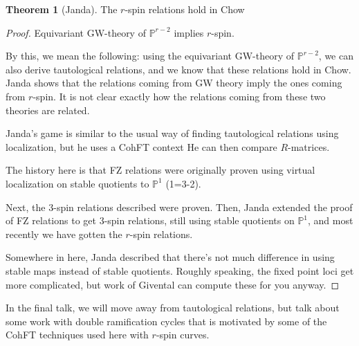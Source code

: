 \documentclass{amsart}
\theoremstyle{definition}
\newtheorem{theorem}{Theorem}
\newcommand{\proj}{\mathbb{P}}
\begin{document}
\begin{theorem}[Janda]
The $r$-spin relations hold in Chow
\end{theorem}
\begin{proof}
Equivariant GW-theory of $\proj^{r-2}$ implies $r$-spin.  

By this, we mean the following: using the equivariant GW-theory of $\proj^{r-2}$, we can also derive tautological relations, and we know that these relations hold in Chow.  Janda shows that the relations coming from GW theory imply the ones coming from $r$-spin.  It is not clear exactly how the relations coming from these two theories are related.

Janda's game is similar to the usual way of finding tautological relations using localization, but he uses a CohFT context  He can then compare $R$-matrices.

The history here is that FZ relations were originally proven using virtual localization on stable quotients to $\proj^1$ (1=3-2).  

Next, the 3-spin relations described were proven.  Then, Janda extended the proof of FZ relations to get $3$-spin relations, still using stable quotients on $\proj^1$, and most recently we have gotten the $r$-spin relations.

Somewhere in here, Janda described that there's not much difference in using stable maps instead of stable quotients.  Roughly speaking, the fixed point loci get more complicated, but work of Givental can compute these for you anyway.
\end{proof}

In the final talk, we will move away from tautological relations, but talk about some work with double ramification cycles that is motivated by some of the CohFT techniques used here with $r$-spin curves.
\end{document}
